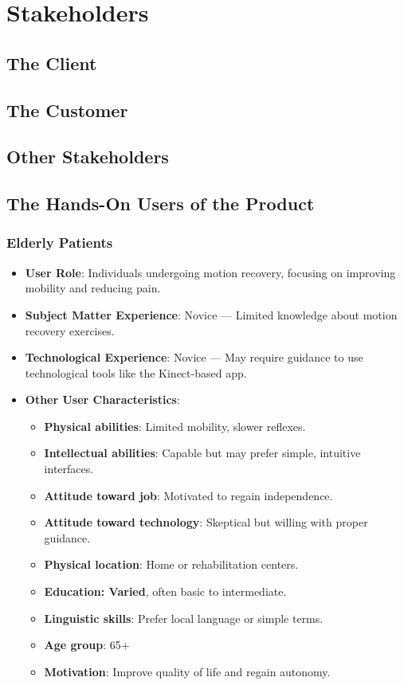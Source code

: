 \section{Stakeholders}
\subsection{The Client}
\subsection{The Customer}
\subsection{Other Stakeholders}

\subsection{The Hands-On Users of the Product}\label{subsec:hands_on_users}
    \subsubsection{Elderly Patients}
        \begin{itemize}
            \item \textbf{User Role}: Individuals undergoing motion recovery, focusing on improving mobility and reducing pain.
            \item \textbf{Subject Matter Experience}: Novice --- Limited knowledge about motion recovery exercises.
            \item \textbf{Technological Experience}: Novice --- May require guidance to use technological tools like the Kinect-based app.
            \item \textbf{Other User Characteristics}:
            \begin{itemize}
                \item \textbf{Physical abilities}: Limited mobility, slower reflexes.
                \item \textbf{Intellectual abilities}: Capable but may prefer simple, intuitive interfaces.
                \item \textbf{Attitude toward job}: Motivated to regain independence.
                \item \textbf{Attitude toward technology}: Skeptical but willing with proper guidance.
                \item \textbf{Physical location}: Home or rehabilitation centers.
                \item \textbf{Education: Varied}, often basic to intermediate.
                \item \textbf{Linguistic skills}: Prefer local language or simple terms.
                \item \textbf{Age group}: 65+
                \item \textbf{Motivation}: Improve quality of life and regain autonomy.
            \end{itemize}
        \end{itemize}
        \clearpage
